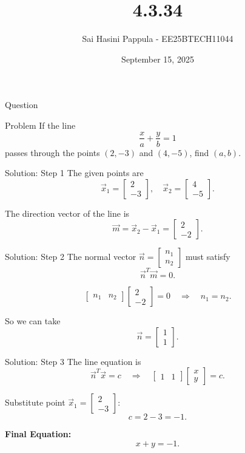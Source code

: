 \documentclass{beamer}
\title %
{4.3.34}
\date{September 15, 2025}
\author %
{Sai Hasini Pappula - EE25BTECH11044}
\begin{document}
\begin{frame}{Question}
\begin{block}{Problem}
If the line
\[
\frac{x}{a} + \frac{y}{b} = 1
\]
passes through the points $(2,-3)$ and $(4,-5)$, find $(a,b)$.
\end{block}
\end{frame}

\begin{frame}{Solution: Step 1}
The given points are
\[
\vec{x}_1 = \begin{bmatrix}2\\-3\end{bmatrix}, \quad
\vec{x}_2 = \begin{bmatrix}4\\-5\end{bmatrix}.
\]

\bigskip
The direction vector of the line is
\[
\vec{m} = \vec{x}_2 - \vec{x}_1
= \begin{bmatrix}2 \\ -2\end{bmatrix}.
\]
\end{frame}

\begin{frame}{Solution: Step 2}
The normal vector $\vec{n} = \begin{bmatrix}n_1 \\ n_2\end{bmatrix}$ must satisfy
\[
\vec{n}^T \vec{m} = 0.
\]

\[
\begin{bmatrix}n_1 & n_2\end{bmatrix}
\begin{bmatrix}2 \\ -2\end{bmatrix} = 0
\quad \Rightarrow \quad n_1 = n_2.
\]

So we can take
\[
\vec{n} = \begin{bmatrix}1 \\ 1\end{bmatrix}.
\]
\end{frame}

\begin{frame}{Solution: Step 3}
The line equation is
\[
\vec{n}^T \vec{x} = c
\quad \Rightarrow \quad
\begin{bmatrix}1 & 1\end{bmatrix}
\begin{bmatrix}x \\ y\end{bmatrix} = c.
\]

Substitute point $\vec{x}_1 = \begin{bmatrix}2\\-3\end{bmatrix}$:
\[
c = 2 - 3 = -1.
\]

\bigskip
\textbf{Final Equation:}
\[
x + y = -1.
\]
\end{frame}
\end{document}
